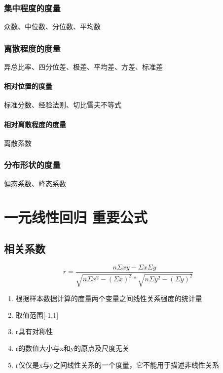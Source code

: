 \documentclass[UTF8,10pt]{book}
\begin{document}
\subsubsection{集中程度的度量 }\label{header-n45}

众数、中位数、分位数、平均数

\subsubsection{离散程度的度量}\label{header-n47}

异总比率、四分位差、极差、平均差、方差、标准差

\paragraph{相对位置的度量}\label{header-n49}

标准分数、经验法则、切比雪夫不等式

\paragraph{相对离散程度的度量}\label{header-n51}

离散系数

\subsubsection{分布形状的度量}\label{header-n53}

偏态系数、峰态系数

\section{一元线性回归 重要公式}\label{header-n55}

\subsection{相关系数}\label{header-n56}

\[r = \frac{n \Sigma xy -\Sigma x \Sigma y }{\sqrt{n \Sigma x^2 - \left( \Sigma x \right)^2}  * \sqrt{n \Sigma y^2 - \left( \Sigma y \right)^2}  }\]

\begin{enumerate}
	\def\labelenumi{\arabic{enumi}.}
	\item
	根据样本数据计算的度量两个变量之间线性关系强度的统计量
	\item
	取值范围{[}-1,1{]}
	\item
	r具有对称性
	\item
	r的数值大小与x和y的原点及尺度无关
	\item
	r仅仅是x与y之间线性关系的一个度量，它不能用于描述非线性关系
\end{enumerate}
\end{document}
